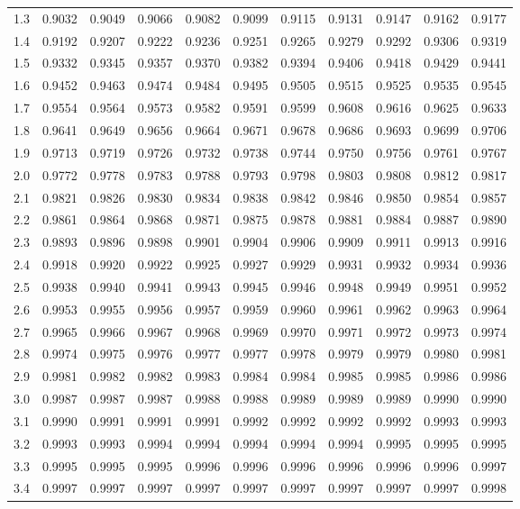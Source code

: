 \begin{frame}
{\begin{tabular}{l|llllllllll}
1.3 & 0.9032 & 0.9049 & 0.9066 & 0.9082 & 0.9099 & 0.9115 & 0.9131 & 0.9147 & 0.9162 & 0.9177 \\ 
1.4 & 0.9192 & 0.9207 & 0.9222 & 0.9236 & 0.9251 & 0.9265 & 0.9279 & 0.9292 & 0.9306 & 0.9319 \\ 
1.5 & 0.9332 & 0.9345 & 0.9357 & 0.9370 & 0.9382 & 0.9394 & 0.9406 & 0.9418 & 0.9429 & 0.9441 \\ 
1.6 & 0.9452 & 0.9463 & 0.9474 & 0.9484 & 0.9495 & 0.9505 & 0.9515 & 0.9525 & 0.9535 & 0.9545 \\ 
1.7 & 0.9554 & 0.9564 & 0.9573 & 0.9582 & 0.9591 & 0.9599 & 0.9608 & 0.9616 & 0.9625 & 0.9633 \\ 
1.8 & 0.9641 & 0.9649 & 0.9656 & 0.9664 & 0.9671 & 0.9678 & 0.9686 & 0.9693 & 0.9699 & 0.9706 \\ 
1.9 & 0.9713 & 0.9719 & 0.9726 & 0.9732 & 0.9738 & 0.9744 & 0.9750 & 0.9756 & 0.9761 & 0.9767 \\ 
2.0 & 0.9772 & 0.9778 & 0.9783 & 0.9788 & 0.9793 & 0.9798 & 0.9803 & 0.9808 & 0.9812 & 0.9817 \\ 
2.1 & 0.9821 & 0.9826 & 0.9830 & 0.9834 & 0.9838 & 0.9842 & 0.9846 & 0.9850 & 0.9854 & 0.9857 \\ 
2.2 & 0.9861 & 0.9864 & 0.9868 & 0.9871 & 0.9875 & 0.9878 & 0.9881 & 0.9884 & 0.9887 & 0.9890 \\ 
2.3 & 0.9893 & 0.9896 & 0.9898 & 0.9901 & 0.9904 & 0.9906 & 0.9909 & 0.9911 & 0.9913 & 0.9916 \\ 
2.4 & 0.9918 & 0.9920 & 0.9922 & 0.9925 & 0.9927 & 0.9929 & 0.9931 & 0.9932 & 0.9934 & 0.9936 \\ 
2.5 & 0.9938 & 0.9940 & 0.9941 & 0.9943 & 0.9945 & 0.9946 & 0.9948 & 0.9949 & 0.9951 & 0.9952 \\ 
2.6 & 0.9953 & 0.9955 & 0.9956 & 0.9957 & 0.9959 & 0.9960 & 0.9961 & 0.9962 & 0.9963 & 0.9964 \\ 
2.7 & 0.9965 & 0.9966 & 0.9967 & 0.9968 & 0.9969 & 0.9970 & 0.9971 & 0.9972 & 0.9973 & 0.9974 \\ 
2.8 & 0.9974 & 0.9975 & 0.9976 & 0.9977 & 0.9977 & 0.9978 & 0.9979 & 0.9979 & 0.9980 & 0.9981 \\ 
2.9 & 0.9981 & 0.9982 & 0.9982 & 0.9983 & 0.9984 & 0.9984 & 0.9985 & 0.9985 & 0.9986 & 0.9986 \\ 
3.0 & 0.9987 & 0.9987 & 0.9987 & 0.9988 & 0.9988 & 0.9989 & 0.9989 & 0.9989 & 0.9990 & 0.9990 \\ 
3.1 & 0.9990 & 0.9991 & 0.9991 & 0.9991 & 0.9992 & 0.9992 & 0.9992 & 0.9992 & 0.9993 & 0.9993 \\ 
3.2 & 0.9993 & 0.9993 & 0.9994 & 0.9994 & 0.9994 & 0.9994 & 0.9994 & 0.9995 & 0.9995 & 0.9995 \\ 
3.3 & 0.9995 & 0.9995 & 0.9995 & 0.9996 & 0.9996 & 0.9996 & 0.9996 & 0.9996 & 0.9996 & 0.9997 \\ 
3.4 & 0.9997 & 0.9997 & 0.9997 & 0.9997 & 0.9997 & 0.9997 & 0.9997 & 0.9997 & 0.9997 & 0.9998 
\end{tabular}

}

\end{frame}

